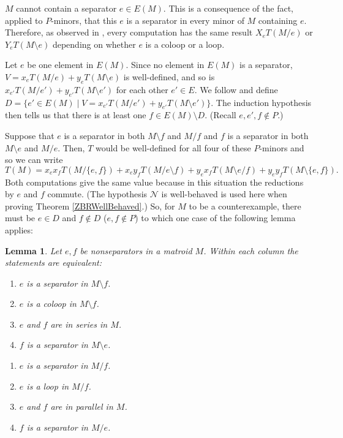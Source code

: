 \documentclass[12pt,leqno]{amsart}
\newtheorem{lem}{Lemma}
\theoremstyle{remark}
\begin{document}
$M$ cannot contain a separator $e\in E(M)$.  This is a consequence of the
fact, applied to $P$-minors, that 
this $e$ is a separator in every minor of $M$ containing $e$.
Therefore, as observed in \cite{Ellis-Monaghan-Traldi}, every
computation has the same result $X_e T(M/e)$ or $Y_e T(M\setminus e)$ 
depending
on whether $e$ is a coloop or a loop.

Let $e$ be one element in $E(M)$.  Since no element in $E(M)$ is a 
separator, $V=x_{e} T(M/{e}) + y_{e} T(M\setminus {e})$ is well-defined, 
and so is $x_{e'} T(M/{e'}) + y_{e'} T(M\setminus {e'})$ 
for each other $e'\in E$.
We follow \cite{Ellis-Monaghan-Traldi} and define
$D=\{e'\in E(M) \mid V=x_{e'} T(M/{e'}) + y_{e'} T(M\setminus {e'})\}$.  The 
induction
hypothesis then tells us 
that there is at least 
one  $f\in E(M)\setminus D$.  
(Recall $e, e', f\not\in P$.)

Suppose that $e$ is a separator in both $M\setminus f$ and 
$M/f$ and $f$ is a separator in both 
$M\setminus e$ and $M/e$.  Then, 
$T$ would
be well-defined for all four of these $P$-minors and so
we can write 
\[
T(M)=x_e x_f T(M/\{e,f\}) + x_e y_f T(M/e\setminus f)
+ y_e x_f T(M\setminus e/f)
+ y_e y_f T(M\setminus\{e,f\}).
\]
Both computations give the same value because in this situation
the reductions by $e$ and $f$ commute. (The hypothesis $\mathcal{N}$
is well-behaved is used here when 
proving Theorem \ref{ZBRWellBehaved}.)
So, for $M$ to be a counterexample, there must be $e\in D$
and $f\not\in D$ ($e, f\not\in P$)
to which one case of the following lemma applies:


\begin{lem}
\cite{MR93a:05047}
Let $e , f$ be nonseparators in a matroid $M$. Within each column the
statements are equivalent:

\begin{minipage}{0.5\textwidth}
\begin{enumerate}
\item
$e$ is a separator in $M\setminus f$.
\item
$e$ is a coloop in $M\setminus f$.
\item
$e$ and $f$ are in series in $M$.
\item
$f$ is a separator in $M\setminus e$.
\end{enumerate}
\end{minipage}
\begin{minipage}{0.5\textwidth}
\begin{enumerate}
\item
$e$ is a separator in $M/ f$.
\item
$e$ is a loop in $M/ f$.
\item
$e$ and $f$ are in parallel in $M$.
\item
$f$  is a separator in $M/e$.
\end{enumerate}
\end{minipage}
\end{lem}
\end{document}
